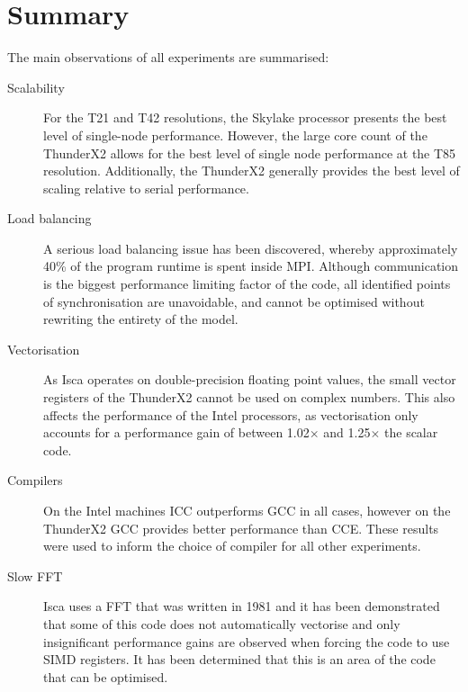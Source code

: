 \documentclass[a4paper,11pt]{report}
\begin{document}
\section{Summary}
The main observations of all experiments are summarised:
\begin{description}

	\item[Scalability] For the T21 and T42 resolutions, the Skylake processor presents the best level of single-node performance. However, the large core count of the ThunderX2 allows for the best level of single node performance at the T85 resolution. Additionally, the ThunderX2 generally provides the best level of scaling relative to serial performance.

	\item[Load balancing] A serious load balancing issue has been discovered, whereby approximately 40\% of the program runtime is spent inside MPI. Although communication is the biggest performance limiting factor of the code, all identified points of synchronisation are unavoidable, and cannot be optimised without rewriting the entirety of the model.
	
	\item[Vectorisation] As Isca operates on double-precision floating point values, the small vector registers of the ThunderX2 cannot be used on complex numbers. This also affects the performance of the Intel processors, as vectorisation only accounts for a performance gain of between 1.02$\times$ and 1.25$\times$ the scalar code. 
	
	\item[Compilers] On the Intel machines ICC outperforms GCC in all cases, however on the ThunderX2 GCC provides better performance than CCE. These results were used to inform the choice of compiler for all other experiments. 
	
	\item[Slow FFT] Isca uses a FFT that was written in 1981 and it has been demonstrated that some of this code does not automatically vectorise and only insignificant performance gains are observed when forcing the code to use SIMD registers. It has been determined that this is an area of the code that can be optimised. 
	
	
\end{description}
\end{document}
